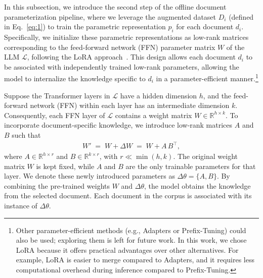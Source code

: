 \documentclass[sigconf,natbib=true,anonymous=false]{acmart}
\begin{document}
In this subsection, we introduce the second step of the offline document parameterization pipeline, where we leverage the augmented dataset $D_i$ (defined in Eq.~\ref{eq:1}) to train the parametric representation $p_i$ for each document $d_i$. 
Specifically, we initialize these parametric representations as low-rank matrices corresponding to the feed-forward network (FFN) parameter matrix $W$ of the LLM $\mathcal{L}$, following the LoRA approach~\cite{hulora}.
This design allows each document \( d_i \) to be associated with independently trained low-rank parameters, allowing the model to internalize the knowledge specific to $d_i$ in a parameter-efficient manner.\footnote{Other parameter-efficient methods (e.g., Adapters or Prefix-Tuning) could also be used; exploring them is left for future work. In this work, we chose LoRA because it offers practical advantages over other alternatives. For example, LoRA is easier to merge compared to Adapters, and it requires less computational overhead during inference compared to Prefix-Tuning.}


Suppose the Transformer layers in \(\mathcal{L}\) have a hidden dimension \(h\), and the feed-forward network (FFN) within each layer has an intermediate dimension \(k\). Consequently, each FFN layer of \(\mathcal{L}\) contains a weight matrix \(W \in \mathbb{R}^{h \times k}\).
To incorporate document-specific knowledge, we introduce low-rank matrices \( A \) and \( B \) such that
%
\begin{align}
    W' \;=\; W + \Delta W \;=\; W +  A \, B^\top ,
    \label{eq:lora_app}
\end{align}
%
where \( A \in \mathbb{R}^{h \times r} \) and \( B \in \mathbb{R}^{k \times r} \), with \( r \ll \min(h, k) \).
The original weight matrix \(W\) is kept fixed, while \(A\) and \(B\) are the only trainable parameters for that layer. 
We denote these newly introduced parameters as \(\Delta \theta = \{A, B\}\). 
By combining the pre-trained weights \(W\) and \(\Delta \theta\), the model obtains the knowledge from the selected document. 
Each document in the corpus is associated with its instance of \(\Delta \theta\). 
\end{document}
